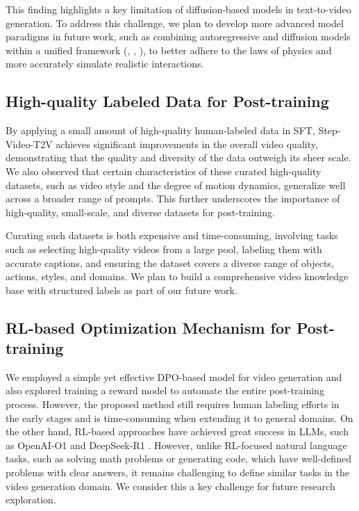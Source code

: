 This finding highlights a key limitation of diffusion-based models in text-to-video generation. To address this challenge, we plan to develop more advanced model paradigms in future work, such as combining autoregressive and diffusion models within a unified framework (\cite{chen2024diffusionforcingnexttokenprediction}, \cite{hacohen2024ltxvideorealtimevideolatent}, \cite{zhou2025tamingteacherforcingmasked}), to better adhere to the laws of physics and more accurately simulate realistic interactions.




\subsection{High-quality Labeled Data for Post-training}
By applying a small amount of high-quality human-labeled data in SFT, Step-Video-T2V achieves significant improvements in the overall video quality, demonstrating that the quality and diversity of the data outweigh its sheer scale. We also observed that certain characteristics of these curated high-quality datasets, such as video style and the degree of motion dynamics, generalize well across a broader range of prompts. This further underscores the importance of high-quality, small-scale, and diverse datasets for post-training.

Curating such datasets is both expensive and time-consuming, involving tasks such as selecting high-quality videos from a large pool, labeling them with accurate captions, and ensuring the dataset covers a diverse range of objects, actions, styles, and domains. We plan to build a comprehensive video knowledge base with structured labels as part of our future work.

\subsection{RL-based Optimization Mechanism for Post-training}
We employed a simple yet effective DPO-based model for video generation and also explored training a reward model to automate the entire post-training process. However, the proposed method still requires human labeling efforts in the early stages and is time-consuming when extending it to general domains. On the other hand, RL-based approaches have achieved great success in LLMs, such as OpenAI-O1 and DeepSeek-R1 \cite{deepseekai2025deepseekr1incentivizingreasoningcapability}. However, unlike RL-focused natural language tasks, such as solving math problems or generating code, which have well-defined problems with clear answers, it remains challenging to define similar tasks in the video generation domain. We consider this a key challenge for future research exploration.


